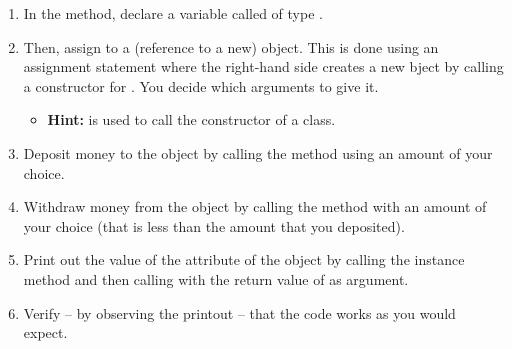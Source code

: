 \begin{enumerate}
  \item In the  method, declare a variable called  of type .
  \item Then, assign to  a (reference to a new)  object. This is done using an assignment statement where the right-hand side creates a new  bject by calling a constructor for . You decide which arguments to give it.
    \begin{itemize}
      \item \textbf{Hint:}  is used to call the constructor of a class.
    \end{itemize}
  \item Deposit money to the  object by calling the  method using an amount of your choice.
  \item Withdraw money from the  object by calling the  method with an amount of your choice (that is less than the amount that you deposited).
  \item Print out the value of the  attribute of the  object by calling the  instance method and then calling  with the return value of  as argument.
  \item Verify -- by observing the printout -- that the code works as you would expect.
\end{enumerate}

